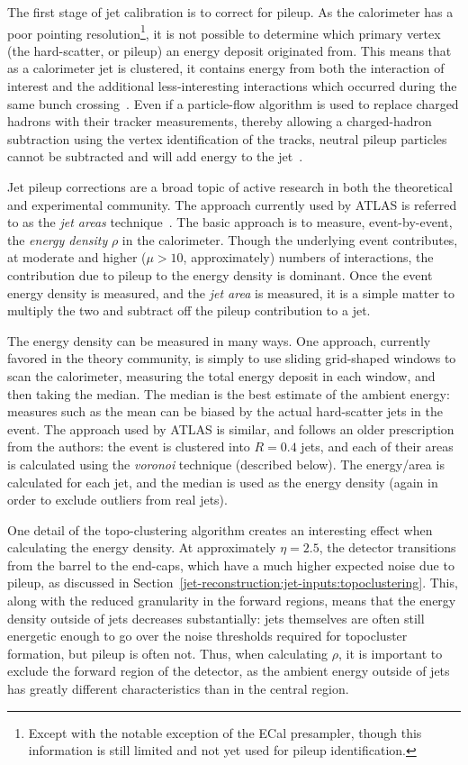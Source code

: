 The first stage of jet calibration is to correct for pileup. As the calorimeter has a poor pointing resolution\footnote{Except with the notable exception of the ECal presampler, though this information is still limited and not yet used for pileup identification.}, it is not possible to determine which primary vertex (the hard-scatter, or pileup) an energy deposit originated from. This means that as a calorimeter jet is clustered, it contains energy from both the interaction of interest and the additional less-interesting interactions which occurred during the same bunch crossing~\cite{jetareas}. Even if a particle-flow algorithm is used to replace charged hadrons with their tracker measurements, thereby allowing a charged-hadron subtraction using the vertex identification of the tracks, neutral pileup particles cannot be subtracted and will add energy to the jet~\cite{CMS-PAS-JME-13-005}.

Jet pileup corrections are a broad topic of active research in both the theoretical and experimental community. The approach currently used by ATLAS is referred to as the \textit{jet areas} technique~\cite{jetareas}. The basic approach is to measure, event-by-event, the \textit{energy density} $\rho$ in the calorimeter. Though the underlying event contributes, at moderate and higher ($\mu > 10$, approximately) numbers of interactions, the contribution due to pileup to the energy density is dominant. Once the event energy density is measured, and the \textit{jet area} is measured, it is a simple matter to multiply the two and subtract off the pileup contribution to a jet.

The energy density can be measured in many ways. One approach, currently favored in the theory community, is simply to use sliding grid-shaped windows to scan the calorimeter, measuring the total energy deposit in each window, and then taking the median. The median is the best estimate of the ambient energy: measures such as the mean can be biased by the actual hard-scatter jets in the event. The approach used by ATLAS is similar, and follows an older prescription from the authors: the event is clustered into \kt $R=0.4$ jets, and each of their areas is calculated using the \textit{voronoi} technique (described below). The energy/area is calculated for each jet, and the median is used as the energy density (again in order to exclude outliers from real jets).

One detail of the topo-clustering algorithm creates an interesting effect when calculating the energy density. At approximately $\eta = 2.5$, the detector transitions from the barrel to the end-caps, which have a much higher expected noise due to pileup, as discussed in Section~\ref{jet-reconstruction:jet-inputs:topoclustering}. This, along with the reduced granularity in the forward regions, means that the energy density outside of jets decreases substantially: jets themselves are often still energetic enough to go over the noise thresholds required for topocluster formation, but pileup is often not. Thus, when calculating $\rho$, it is important to exclude the forward region of the detector, as the ambient energy outside of jets has greatly different characteristics than in the central region.

